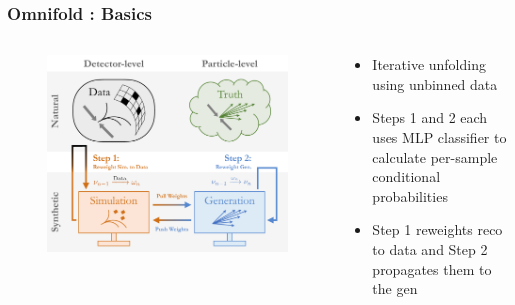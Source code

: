 \documentclass[10pt, aspectratio = 169]{beamer}
\begin{document}
	\begin{frame}
		\frametitle{Omnifold : Basics}
		\begin{columns}
			\begin{column}{0.5\paperwidth}
				\begin{figure}
					\includegraphics[width=\linewidth]{omnifold_schematic.pdf}
				\end{figure}
			\end{column}
			\begin{column}{0.45\paperwidth}
				\begin{itemize}
					\item<1-> Iterative unfolding using unbinned data
					\item<2-> Steps 1 and  2 each uses MLP classifier to calculate per-sample conditional probabilities
					\item<3->  Step 1 reweights reco to data and Step 2 propagates them to the gen
				\end{itemize}
			\end{column}
		\end{columns}
	\end{frame}
	
\end{document}
